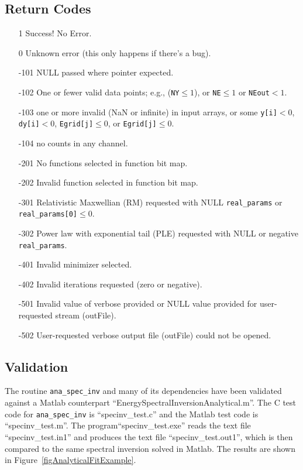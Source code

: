 \documentclass{article}    %
\begin{document}
\subsection{Return Codes}
\begin{itemize}
\item[1] Success! No Error.
\item[0] Unknown error (this only happens if there's a bug).
\item[-101] NULL passed where pointer expected.
\item[-102] One or fewer valid data points; e.g., (\verb|NY|$ \le 1$), or \verb|NE|$\le 1$ or \verb|NEout|$<1$.
\item[-103] one or more invalid (NaN or infinite) in input arrays, or 
  some \verb|y[i]|$<0$, \verb|dy[i]|$<0$, \verb|Egrid[j]|$\le 0$, or
  \verb|Egrid[j]|$\le 0$.
\item[-104] no counts in any channel.
\item[-201] No functions selected in function bit map.
\item[-202] Invalid function selected in function bit map.
\item[-301] Relativistic Maxwellian (RM) requested with NULL \verb|real_params| or \verb|real_params[0]|$ \le 0$.
\item[-302] Power law with exponential tail (PLE) requested with NULL or negative \verb|real_params|.
\item[-401] Invalid minimizer selected.
\item[-402] Invalid iterations requested (zero or negative).
\item[-501] Invalid value of verbose provided or NULL value provided for user-requested stream (outFile).
\item[-502] User-requested verbose output file (outFile) could not be opened.
\end{itemize}

\subsection{Validation}

The routine \verb|ana_spec_inv| and many of its dependencies have been
validated against a Matlab counterpart
``EnergySpectralInversionAnalytical.m''. The C test code for \verb|ana_spec_inv|
is ``specinv\_test.c'' and the Matlab test code is
``specinv\_test.m''.  The program``specinv\_test.exe'' reads the text file
``specinv\_test.in1'' and produces the text file
``specinv\_test.out1'', which is then compared to the same spectral
inversion solved in Matlab. The results are shown in
Figure~\ref{figAnalyticalFitExample}.
\end{document}
